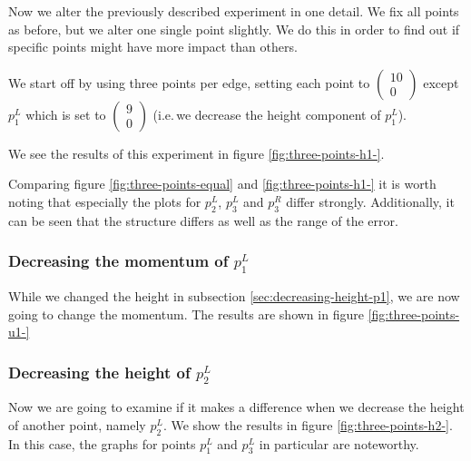 \documentclass{article}
\begin{document}
Now we alter the previously described experiment in one detail. We fix all points as before, but we alter one single point slightly. We do this in order to find out if specific points might have more impact than others.

We start off by using three points per edge, setting each point to $
\begin{pmatrix}
  10 \\ 0
\end{pmatrix}$ except $p_1^L$ which is set to $
\begin{pmatrix}
  9 \\ 0
\end{pmatrix}
$ (i.e.\,we decrease the height component of $p_1^L$).



We see the results of this experiment in figure \ref{fig:three-points-h1-}.

Comparing figure \ref{fig:three-points-equal} and \ref{fig:three-points-h1-} it is worth noting that especially the plots for $p_2^L$, $p_3^L$ and $p_3^R$ differ strongly. Additionally, it can be seen that the structure differs as well as the range of the error.

\subsubsection{\texorpdfstring{Decreasing the momentum of $p_1^L$}{Decreasing the momentum of p1L}}
\label{sec:decreasing-momentum-p1}

While we changed the height in subsection \ref{sec:decreasing-height-p1}, we are now going to change the momentum. The results are shown in figure \ref{fig:three-points-u1-}



\subsubsection{\texorpdfstring{Decreasing the height of $p_2^L$}{Decreasing the height of p2L}}
\label{sec:decreasing-height-p2}

Now we are going to examine if it makes a difference when we decrease the height of another point, namely $p_2^L$. We show the results in figure \ref{fig:three-points-h2-}. In this case, the graphs for points $p_1^L$ and $p_3^L$ in particular are noteworthy.


\end{document}
